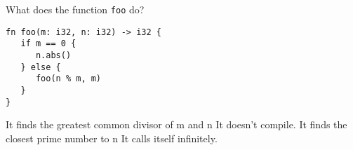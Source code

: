 %
%
What does the function \texttt{foo} do?
\begin{lstlisting}
fn foo(m: i32, n: i32) -> i32 {
   if m == 0 {
      n.abs()
   } else {
      foo(n % m, m)
   }
}
\end{lstlisting}
  \choice It finds the greatest common divisor of m and n
  \choice It doesn't compile.
  \choice It finds the closest prime number to n
  \choice It calls itself infinitely.
